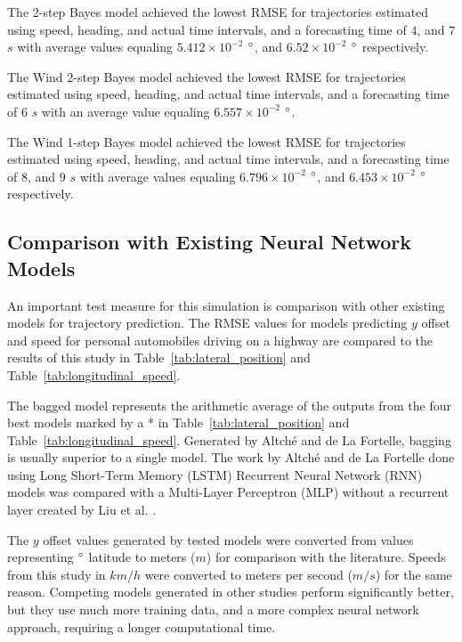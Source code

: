 \documentclass[preprint,12pt]{elsarticle}
\begin{document}
The 2-step Bayes model achieved the lowest RMSE for trajectories estimated using speed, heading, and actual time intervals, and a forecasting time of $4$, and $7$ $s$ with average values equaling $5.412 \times 10^{-2}$ $\degree$, and $6.52 \times 10^{-2}$ $\degree$ respectively.

The Wind 2-step Bayes model achieved the lowest RMSE for trajectories estimated using speed, heading, and actual time intervals, and a forecasting time of $6$ $s$ with an average value equaling $6.557 \times 10^{-2}$ $\degree$.

The Wind 1-step Bayes model achieved the lowest RMSE for trajectories estimated using speed, heading, and actual time intervals, and a forecasting time of $8$, and $9$ $s$ with average values equaling $6.796 \times 10^{-2}$ $\degree$, and $6.453 \times 10^{-2}$ $\degree$ respectively.

\subsection{Comparison with Existing Neural Network Models}

An important test measure for this simulation is comparison with other existing models for trajectory prediction. The RMSE values for models predicting $y$ offset and speed for personal automobiles driving on a highway are compared to the results of this study in Table~\ref{tab:lateral_position} and Table~\ref{tab:longitudinal_speed}.

The bagged model represents the arithmetic average of the outputs from the four best models marked by a * in Table~\ref{tab:lateral_position} and Table~\ref{tab:longitudinal_speed}. Generated by Altché and de La Fortelle, bagging is usually superior to a single model. The work by Altché and de La Fortelle \cite{altche2017lstm} done using Long Short-Term Memory (LSTM) Recurrent Neural Network (RNN) models was compared with a Multi-Layer Perceptron (MLP) without a recurrent layer created by Liu et al. \cite{liu2014vehicle}.

The $y$ offset values generated by tested models were converted from values representing $\degree$ latitude to meters ($m$) for comparison with the literature. Speeds from this study in $km/h$ were converted to meters per second ($m/s$) for the same reason. Competing models generated in other studies perform significantly better, but they use much more training data, and a more complex neural network approach, requiring a longer computational time.
\end{document}
